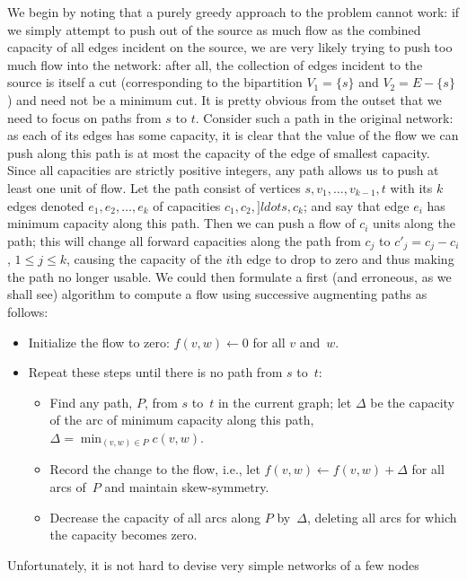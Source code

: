 \documentclass[11pt]{article}
\begin{document}
We begin by noting that a purely greedy approach to the problem cannot work:
if we simply attempt to push out of the source as much flow as the combined
capacity of all edges incident on the source, we are very likely trying to
push too much flow into the network: after all, the collection of edges
incident to the source is itself a cut (corresponding to the bipartition
$V_1=\{s\}$ and $V_2=E-\{s\}$) and need not be a minimum cut.
It is pretty obvious from the outset that we need to focus on paths from $s$
to $t$.
Consider such a path in the original network: as each of its edges has some
capacity, it is clear that the value of the flow we can push along this path
is at most the capacity of the edge of smallest capacity. Since all capacities
are strictly positive integers, any path allows us to push at least one unit
of flow.  Let the path consist of vertices $s,v_1,\ldots,v_{k-1},t$ with
its $k$ edges denoted $e_1,e_2,\ldots,e_k$ of capacities $c_1,c_2,]ldots,c_k$;
and say that edge $e_i$ has minimum capacity along this path.
Then we can push a flow of $c_i$ units along the path; this will change
all forward capacities along the path from $c_j$ to $c'_j=c_j-c_i$,
$1\leq j\leq k$, causing the capacity of the $i$th edge to drop to zero
and thus making the path no longer usable.
We could then formulate a first (and erroneous, as we shall see)
algorithm to compute a flow using successive augmenting paths as follows:
\begin{itemize}
  \item
    Initialize the flow to zero: $f(v,w)\leftarrow 0$ for all $v$ and~$w$.
  \item
    Repeat these steps until there is no path from $s$ to~$t$:
    \begin{itemize}
      \itemsep 0pt
      \item
        Find any path, $P$, from $s$ to~$t$ in the current graph;
        let $\Delta$ be the capacity of the arc of minimum capacity along
        this path, $\Delta = \min_{(v,w) \in P} c(v,w)$.
      \item
        Record the change to the flow, i.e., let
        $f(v,w) \leftarrow f(v,w) + \Delta$ for all arcs
        of~$P$ and maintain skew-symmetry.
      \item
        Decrease the capacity of all arcs along $P$ by~$\Delta$,
        deleting all arcs for which the capacity becomes
        zero.
    \end{itemize}
\end{itemize}
Unfortunately, it is not hard to devise very simple networks of a few nodes
\end{document}
